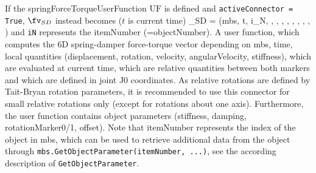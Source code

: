     If the springForceTorqueUserFunction $\mathrm{UF}$ is defined and \texttt{activeConnector = True}, 
    $\fv_{SD}$ instead becomes ($t$ is current time)
    \be
      \fv_{SD} = (mbs, t, i_N, , , , , 
                             , , , , )
    \ee
    and \texttt{iN} represents the itemNumber (=objectNumber).
    A user function, which computes the 6D spring-damper force-torque vector depending on mbs, time, local quantities 
    (displacement, rotation, velocity, angularVelocity, stiffness), which are evaluated at current time, which are relative quantities between 
    both markers and which are defined in joint J0 coordinates. 
    As relative rotations are defined by Tait-Bryan rotation parameters, it is recommended to use this connector for small relative rotations only 
    (except for rotations about one axis).
    Furthermore, the user function contains object parameters (stiffness, damping, rotationMarker0/1, offset).
    Note that itemNumber represents the index of the object in mbs, which can be used to retrieve additional data from the object through
    \texttt{mbs.GetObjectParameter(itemNumber, ...)}, see the according description of \texttt{GetObjectParameter}.
    

